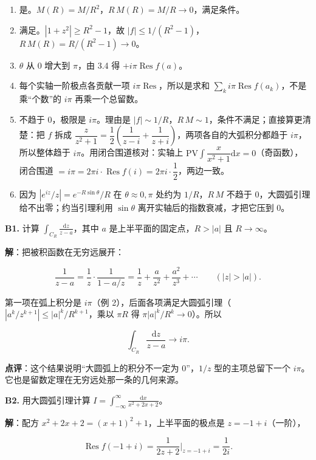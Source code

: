 \documentclass[11pt]{ctexart}
\let\orighdr\hdr
\renewcommand{\hdr}[2]{\par\orighdr{#1}{#2}}
\begin{document}
\begin{enumerate}
\item 是。$M(R)=M/R^{2}$，$R\,M(R)=M/R\to0$，满足条件。
\item 满足。$|1+z^{2}|\ge R^{2}-1$，故 $|f|\le1/(R^{2}-1)$，$R\,M(R)=R/(R^{2}-1)\to0$。
\item $\theta$ 从 $0$ 增大到 $\pi$，由 3.4 得 $+i\pi\operatorname{Res}f(a)$。
\item 每个实轴一阶极点各贡献一项 $i\pi\operatorname{Res}$，所以是求和 $\sum_k i\pi\operatorname{Res}f(a_k)$，不是乘“个数”的 $i\pi$ 再乘一个总留数。
\item 不趋于 0，极限是 $i\pi$。理由是 $|f|\sim1/R$，$R\,M\sim1$，条件不满足；直接算更清楚：把 $f$ 拆成 $\dfrac{z}{z^{2}+1}=\dfrac12\left(\dfrac{1}{z-i}+\dfrac{1}{z+i}\right)$，两项各自的大弧积分都趋于 $i\pi$，所以整体趋于 $i\pi$。用闭合围道核对：实轴上 $\mathrm{PV}\!\int\dfrac{x}{x^{2}+1}\mathrm{d}x=0$（奇函数），闭合围道 $=i\pi=2\pi i\cdot\operatorname{Res}f(i)=2\pi i\cdot\dfrac12$，两边一致。
\item 因为 $|e^{iz}/z|=e^{-R\sin\theta}/R$ 在 $\theta\approx0,\pi$ 处约为 $1/R$，$R\,M$ 不趋于 0，大圆弧引理给不出零；约当引理利用 $\sin\theta$ 离开实轴后的指数衰减，才把它压到 0。
\end{enumerate}

\flowerrule


\textbf{B1.} 计算 $\displaystyle\int_{C_R}\frac{\mathrm{d}z}{z-a}$，其中 $a$ 是上半平面的固定点，$R>|a|$ 且 $R\to\infty$。

\textbf{解}：把被积函数在无穷远展开：

$$
\frac{1}{z-a}=\frac1z\cdot\frac{1}{1-a/z}=\frac1z+\frac{a}{z^{2}}+\frac{a^{2}}{z^{3}}+\cdots\qquad(|z|>|a|).
$$

第一项在弧上积分是 $i\pi$（例 2），后面各项满足大圆弧引理（$|a^{k}/z^{k+1}|\le |a|^{k}/R^{k+1}$，乘以 $\pi R$ 得 $\pi|a|^{k}/R^{k}\to0$）。所以

$$
\int_{C_R}\frac{\mathrm{d}z}{z-a}\to i\pi .
$$

\textbf{点评}：这个结果说明“大圆弧上的积分不一定为 0”，$1/z$ 型的主项总留下一个 $i\pi$。它也是留数定理在无穷远处那一条的几何来源。

\textbf{B2.} 用大圆弧引理计算 $\displaystyle I=\int_{-\infty}^{\infty}\frac{\mathrm{d}x}{x^{2}+2x+2}$。

\textbf{解}：配方 $x^{2}+2x+2=(x+1)^{2}+1$，上半平面的极点是 $z=-1+i$（一阶），

$$
\operatorname{Res}f(-1+i)=\frac{1}{2z+2}\Big|_{z=-1+i}=\frac{1}{2i}.
$$
\end{document}
